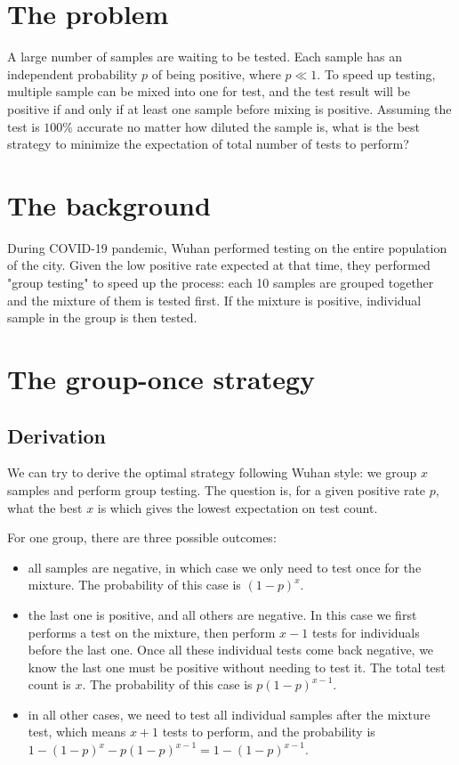 \documentclass[]{article}
\begin{document}
\section{The problem}
A large number of samples are waiting to be tested. Each sample has an independent probability $p$ of being positive, where $p \ll 1$. To speed up testing, multiple sample can be mixed into one for test, and the test result will be positive if and only if at least one sample before mixing is positive. Assuming the test is $100\%$ accurate no matter how diluted the sample is, what is the best strategy to minimize the expectation of total number of tests to perform?

\section{The background}

During COVID-19 pandemic, Wuhan performed testing on the entire population of the city. Given the low positive rate expected at that time, they performed "group testing" to speed up the process: each 10 samples are grouped together and the mixture of them is tested first. If the mixture is positive, individual sample in the group is then tested.

\section{The group-once strategy}
\subsection{Derivation}
We can try to derive the optimal strategy following Wuhan style: we group $x$ samples and perform group testing. The question is, for a given positive rate $p$, what the best $x$ is which gives the lowest expectation on test count.

For one group, there are three possible outcomes:
\begin{itemize}
	\item all samples are negative, in which case we only need to test once for the mixture. The probability of this case is $(1-p)^x$.
	\item the last one is positive, and all others are negative. In this case we first performs a test on the mixture, then perform $x - 1$ tests for individuals before the last one. Once all these individual tests come back negative, we know the last one must be positive without needing to test it. The total test count is $x$. The probability of this case is $p(1-p)^{x - 1}$.
	\item in all other cases, we need to test all individual samples after the mixture test, which means $x + 1$ tests to perform, and the probability is $1 -(1-p)^x -  p(1-p)^{x - 1} = 1 - (1-p)^{x - 1}$.
\end{itemize}
\end{document}
